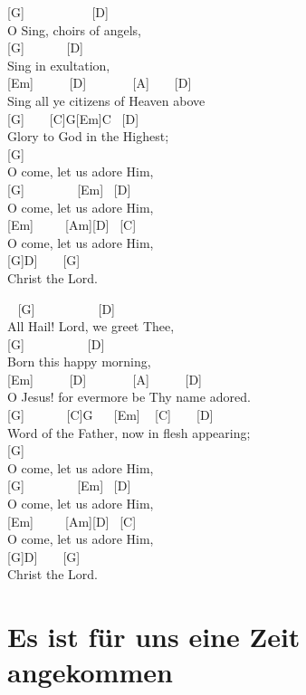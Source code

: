 \documentclass[
  letterpaper,
  twoside=false]{scrbook}
\begin{document}
{[}G{]} ~ ~ ~ ~ ~ ~ {[}D{]}\\
O Sing, choirs of angels,\\
{[}G{]} ~ ~ ~ ~{[}D{]}\\
Sing in exultation,\\
{[}Em{]} ~ ~ ~ {[}D{]} ~ ~ ~ ~ {[}A{]} ~ ~ {[}D{]}\\
Sing all ye citizens of Heaven above\\
{[}G{]} ~ ~ {[}C{]}G{[}Em{]}C ~{[}D{]}\\
Glory to God in the Highest;\\
{[}G{]}\\
O come, let us adore Him,\\
{[}G{]} ~ ~ ~ ~ ~{[}Em{]} ~{[}D{]}\\
O come, let us adore Him,\\
{[}Em{]} ~ ~ ~{[}Am{]}{[}D{]} ~{[}C{]}\\
O come, let us adore Him,\\
{[}G{]}D{]} ~ ~ {[}G{]}\\
Christ the Lord.

~ {[}G{]} ~ ~ ~ ~ ~ ~{[}D{]}\\
All Hail! Lord, we greet Thee,\\
{[}G{]} ~ ~ ~ ~ ~ ~{[}D{]}\\
Born this happy morning,\\
{[}Em{]} ~ ~ ~ {[}D{]} ~ ~ ~ ~ {[}A{]} ~ ~ ~ {[}D{]}\\
O Jesus! for evermore be Thy name adored.\\
{[}G{]} ~ ~ ~ ~{[}C{]}G ~ ~{[}Em{]} ~ {[}C{]} ~ ~ {[}D{]}\\
Word of the Father, now in flesh appearing;\\
{[}G{]}\\
O come, let us adore Him,\\
{[}G{]} ~ ~ ~ ~ ~{[}Em{]} ~{[}D{]}\\
O come, let us adore Him,\\
{[}Em{]} ~ ~ ~{[}Am{]}{[}D{]} ~{[}C{]}\\
O come, let us adore Him,\\
{[}G{]}D{]} ~ ~ {[}G{]}\\
Christ the Lord.

\hypertarget{es-ist-fuxfcr-uns-eine-zeit-angekommen}{%
\chapter{Es ist für uns eine Zeit
angekommen}\label{es-ist-fuxfcr-uns-eine-zeit-angekommen}}
\end{document}
